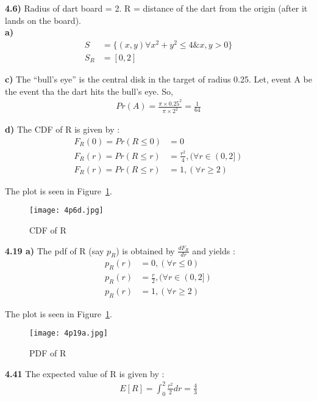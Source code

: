 \documentclass{article}
\begin{document}
{\bf 4.6)} Radius of dart board = 2. R = distance of the dart from the origin (after it lands on the board). \\

{\bf a) }  
\begin{align*}
S &= \{ (x,y) \forall x^2 + y^2 \leq 4 \& x,y > 0 \}  \\
S_R &= [0,2]
\end{align*}
\vspace{2 mm}

{\bf c)} The “bull’s eye” is the central disk in the target of radius 0.25. Let, event A be the event tha the dart hits the bull’s eye. So, 
\begin{align*}
Pr(A) = \frac{\pi \times {0.25}^2}{\pi \times {2}^2} = \frac{1}{64}
\end{align*}

{\bf d)} The CDF of R is given by : 
\begin{align*}
F_R(0)=Pr(R \leq 0) &= 0 \\
F_R(r)=Pr(R \leq r) &= \frac{r^2}{4} , (\forall r \in (0,2]) \\
F_R(r)=Pr(R \leq r) &= 1 , (\forall r \geq 2)
\end{align*}

The plot is seen in Figure~\ref{Rcdf}. 

\begin{figure} [h!]
\centering
\texttt{[image: 4p6d.jpg]}
\caption{CDF of R}
\label{Rcdf}
\end{figure}

\vspace{5 mm}
{\bf 4.19 a)} The pdf of R (say $p_R$) is obtained by $\frac{d F_R}{dr}$ and yields :
\begin{align*}
p_R(r) &= 0 , (\forall r \leq 0)\\
p_R(r) &= \frac{r}{2} , (\forall r \in (0,2]) \\
p_R(r) &= 1 , (\forall r \geq 2)
\end{align*}

The plot is seen in Figure~\ref{Rcdf}. 

\begin{figure} [h!]
\centering
\texttt{[image: 4p19a.jpg]}
\caption{PDF of R}
\label{Rpdf}
\end{figure}

\vspace{5 mm}

{\bf 4.41 } The expected value of R is given by :
\begin{align*}
E[R] = \int_{0}^{2}\frac{r^2}{2} dr = \frac{4}{3}
\end{align*}
\end{document}
